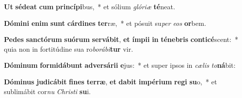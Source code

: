 \item \textbf{Ut} \textbf{sé}\textbf{de}\textbf{at} \textbf{cum} \textbf{prin}\textbf{cí}\textbf{pi}bus,~* et sólium \textit{gló}\textit{ri}\textit{æ} \textbf{té}neat.
\item \textbf{Dó}\textbf{mi}\textbf{ni} \textbf{e}\textbf{nim} \textbf{sunt} \textbf{cár}\textbf{di}\textbf{nes} \textbf{ter}ræ,~* et pósuit su\textit{per} \textit{e}\textit{os} \textbf{or}bem.
\item \textbf{Pe}\textbf{des} \textbf{sanc}\textbf{tó}\textbf{rum} \textbf{su}\textbf{ó}\textbf{rum} \textbf{ser}\textbf{vá}\textbf{bit}, \textbf{et} \textbf{ím}\textbf{pi}\textbf{i} \textbf{in} \textbf{té}\textbf{ne}\textbf{bris} \textbf{con}\textbf{ti}\textbf{cé}scent:~* quia non in fortitúdine sua ro\textit{bo}\textit{rá}\textit{bi}\textbf{tur} vir.
\item \textbf{Dó}\textbf{mi}\textbf{num} \textbf{for}\textbf{mi}\textbf{dá}\textbf{bunt} \textbf{ad}\textbf{ver}\textbf{sá}\textbf{ri}\textbf{i} \textbf{e}jus:~* et super ipsos in \textit{cæ}\textit{lis} \textit{to}\textbf{ná}bit:
\item \textbf{Dó}\textbf{mi}\textbf{nus} \textbf{ju}\textbf{di}\textbf{cá}\textbf{bit} \textbf{fi}\textbf{nes} \textbf{ter}\textbf{ræ}, \textbf{et} \textbf{da}\textbf{bit} \textbf{im}\textbf{pé}\textbf{ri}\textbf{um} \textbf{re}\textbf{gi} \textbf{su}o,~* et sublimábit cor\textit{nu} \textit{Chris}\textit{ti} \textbf{su}i.
